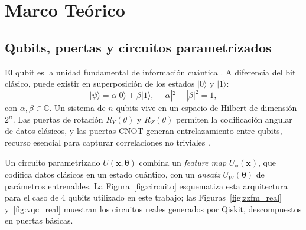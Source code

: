 \documentclass[conference]{IEEEtran}
\begin{document}
\section{Marco Teórico}
\label{sec:teoria}

\subsection{Qubits, puertas y circuitos parametrizados}
El qubit es la unidad fundamental de información cuántica \cite{nielsen2010}. A diferencia del bit clásico, puede existir en superposición de los estados $|0\rangle$ y $|1\rangle$:
\begin{equation}
|\psi\rangle = \alpha|0\rangle + \beta|1\rangle, \quad |\alpha|^2+|\beta|^2=1,
\end{equation}
con $\alpha,\beta\in\mathbb{C}$. Un sistema de $n$ qubits vive en un espacio de Hilbert de dimensión $2^n$. Las puertas de rotación $R_Y(\theta)$ y $R_Z(\theta)$ permiten la codificación angular de datos clásicos, y las puertas $\mathrm{CNOT}$ generan entrelazamiento entre qubits, recurso esencial para capturar correlaciones no triviales \cite{nielsen2010}.

Un circuito parametrizado $U(\mathbf{x},\boldsymbol{\theta})$ combina un \textit{feature map} $U_\phi(\mathbf{x})$, que codifica datos clásicos en un estado cuántico, con un \textit{ansatz} $U_W(\boldsymbol{\theta})$ de parámetros entrenables. La Figura~\ref{fig:circuito} esquematiza esta arquitectura para el caso de 4 qubits utilizado en este trabajo; las Figuras~\ref{fig:zzfm_real} y~\ref{fig:vqc_real} muestran los circuitos reales generados por Qiskit, descompuestos en puertas básicas.
\end{document}
